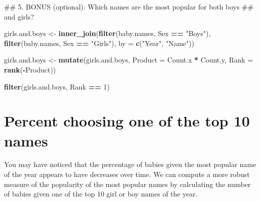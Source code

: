 \documentclass[]{book}
\newenvironment{Shaded}{\begin{snugshade}}{\end{snugshade}}
\newcommand{\KeywordTok}[1]{\textcolor[rgb]{0.13,0.29,0.53}{\textbf{#1}}}
\newcommand{\DataTypeTok}[1]{\textcolor[rgb]{0.13,0.29,0.53}{#1}}
\newcommand{\DecValTok}[1]{\textcolor[rgb]{0.00,0.00,0.81}{#1}}
\newcommand{\StringTok}[1]{\textcolor[rgb]{0.31,0.60,0.02}{#1}}
\newcommand{\OperatorTok}[1]{\textcolor[rgb]{0.81,0.36,0.00}{\textbf{#1}}}
\newcommand{\NormalTok}[1]{#1}
\begin{document}
\begin{Shaded}
\begin{Highlighting}[]
\NormalTok{## 5. BONUS (optional): Which names are the most popular for both boys }
\NormalTok{##    and girls?}
\end{Highlighting}
\end{Shaded}

\begin{Shaded}
\begin{Highlighting}[]
\NormalTok{girls.and.boys <-}\StringTok{ }\KeywordTok{inner_join}\NormalTok{(}\KeywordTok{filter}\NormalTok{(baby.names, Sex }\OperatorTok{==}\StringTok{ "Boys"}\NormalTok{), }
                             \KeywordTok{filter}\NormalTok{(baby.names, Sex }\OperatorTok{==}\StringTok{ "Girls"}\NormalTok{),}
                             \DataTypeTok{by =} \KeywordTok{c}\NormalTok{(}\StringTok{"Year"}\NormalTok{, }\StringTok{"Name"}\NormalTok{))}
\end{Highlighting}
\end{Shaded}

\begin{Shaded}
\begin{Highlighting}[]
\NormalTok{girls.and.boys <-}\StringTok{ }\KeywordTok{mutate}\NormalTok{(girls.and.boys,}
                         \DataTypeTok{Product =}\NormalTok{ Count.x }\OperatorTok{*}\StringTok{ }\NormalTok{Count.y,}
                         \DataTypeTok{Rank =} \KeywordTok{rank}\NormalTok{(}\OperatorTok{-}\NormalTok{Product))}
\end{Highlighting}
\end{Shaded}

\begin{Shaded}
\begin{Highlighting}[]
\KeywordTok{filter}\NormalTok{(girls.and.boys, Rank }\OperatorTok{==}\StringTok{ }\DecValTok{1}\NormalTok{)}
\end{Highlighting}
\end{Shaded}

\section{Percent choosing one of the top 10
names}\label{percent-choosing-one-of-the-top-10-names}

You may have noticed that the percentage of babies given the most
popular name of the year appears to have decreases over time. We can
compute a more robust measure of the popularity of the most popular
names by calculating the number of babies given one of the top 10 girl
or boy names of the year.
\end{document}
